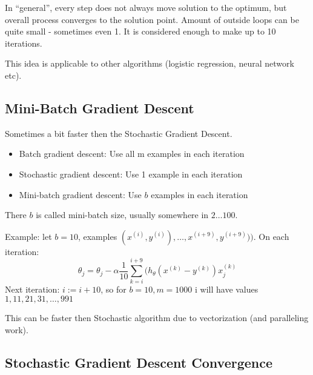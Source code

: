 \documentclass{scrartcl}
\begin{document}
In ``general'', every step does not always move solution to the
optimum, but overall process converges to the solution point. Amount
of outside loops can be quite small - sometimes even 1. It is
considered enough to make up to 10 iterations.

This idea is applicable to other algorithms (logistic regression,
neural network etc).

\subsection{Mini-Batch Gradient Descent}
\label{sec:17-3}

Sometimes a bit faster then the Stochastic Gradient Descent.
\begin{itemize}
\item Batch gradient descent: Use all m examples in each iteration
\item Stochastic gradient descent: Use 1 example in each iteration
\item Mini-batch gradient descent: Use $b$ examples in each iteration
\end{itemize}

There $b$ is called mini-batch size, usually somewhere in $2 \dots
100$.

Example: let $b = 10$, examples $(x^{(i)}, y^{(i)}), \dots, x^{(i+9)},
y^{(i+9)}))$. On each iteration: \[ \theta_j = \theta_j - \alpha
\frac{1}{10} \sum \limits_{k=i}^{i+9}(h_\theta(x^{(k)} - y^{(k)})
x_j^{(k)}\] Next iteration: $ i := i + 10$, so for $b=10, m = 1000$ i
will have values $1, 11, 21, 31, \dots, 991$

This can be faster then Stochastic algorithm due to vectorization (and
paralleling work).

\subsection{Stochastic Gradient Descent Convergence}
\label{sec:17-4}
\end{document}
